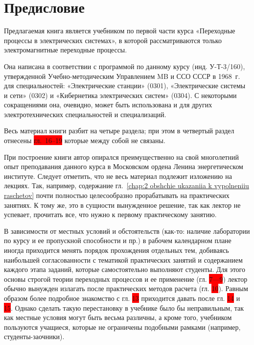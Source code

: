 \chapter*{Предисловие}
\label{chap:0 preface}

Предлагаемая книга является учебником по первой части курса «Переходные процессы в электрических системах», в которой рассматриваются только электромагнитные переходные процессы.

Она написана в соответствии с программой по данному курсу (инд. У-Т-3/160), утвержденной Учебно-методическим Управлением MB и ССО СССР в 1968~г. для специальностей: «Электрические станции» (0301), «Электрические системы и сети» (0302) и «Кибернетика электрических систем» (0304). С некоторыми сокращениями она, очевидно, может быть использована и для других электротехнических специальностей и специализаций.

Весь материал книги разбит на четыре раздела; при этом в четвертый раздел отнесены \colorbox{red}{гл.~16--19} которые между собой не связаны.

При построение книги автор опирался преимущественно на свой многолетний опыт преподавания данного курса в Московском ордена Ленина энергетическом институте. Следует отметить, что не весь материал подлежит изложению на лекциях. Так, например, содержание гл.~\ref{chap:2 obshchie ukazaniia k vypolneniiu raschetov} почти полностью целесообразно прорабатывать на практических занятиях. К тому же, это в сущности вынужденное решение, так как лектор не успевает, прочитать все, что нужно к первому практическому занятию.

В зависимости от местных условий и обстоятельств (как-то: наличие лаборатории по курсу и ее пропускной способности и пр.) в рабочем календарном плане иногда приходится менять порядок прохождения отдельных тем, добиваясь наибольшей согласованности с тематикой практических занятий и содержанием каждого этапа заданий, которые самостоятельно выполняют студенты. Для этого основы строгой теории переходных процессов и ее применение (гл. \colorbox{red}{7—9}) лектор обычно вынужден излагать после практических методов расчета (гл. \colorbox{red}{10}). Равным образом более подробное знакомство с гл. \colorbox{red}{13} приходится давать после гл. \colorbox{red}{14} и \colorbox{red}{15}. Однако сделать такую перестановку в учебнике было бы неправильным, так как местные условия могут быть весьма различны, а кроме того, учебником пользуются учащиеся, которые не ограничены подобными рамками (например, студенты-заочники).

